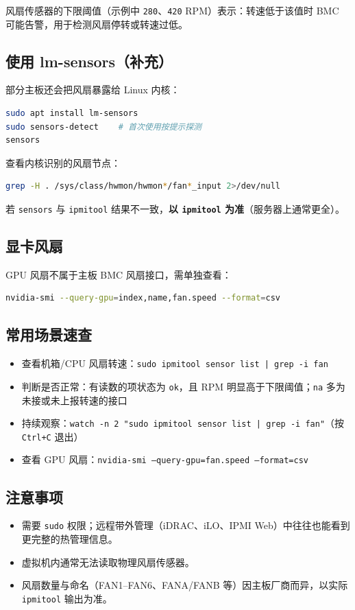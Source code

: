 风扇传感器的下限阈值（示例中 \texttt{280}、\texttt{420} RPM）表示：转速低于该值时 BMC 可能告警，用于检测风扇停转或转速过低。

\subsection{使用 lm-sensors（补充）}

部分主板还会把风扇暴露给 Linux 内核：

\begin{lstlisting}[language=sh]
sudo apt install lm-sensors
sudo sensors-detect    # 首次使用按提示探测
sensors
\end{lstlisting}

查看内核识别的风扇节点：

\begin{lstlisting}[language=sh]
grep -H . /sys/class/hwmon/hwmon*/fan*_input 2>/dev/null
\end{lstlisting}

若 \texttt{sensors} 与 \texttt{ipmitool} 结果不一致，\textbf{以 \texttt{ipmitool} 为准}（服务器上通常更全）。

\subsection{显卡风扇}

GPU 风扇不属于主板 BMC 风扇接口，需单独查看：

\begin{lstlisting}[language=sh]
nvidia-smi --query-gpu=index,name,fan.speed --format=csv
\end{lstlisting}

\subsection{常用场景速查}

\begin{itemize}
    \item 查看机箱/CPU 风扇转速：\texttt{sudo ipmitool sensor list | grep -i fan}
    \item 判断是否正常：有读数的项状态为 \texttt{ok}，且 RPM 明显高于下限阈值；\texttt{na} 多为未接或未上报转速的接口
    \item 持续观察：\texttt{watch -n 2 "sudo ipmitool sensor list | grep -i fan"}（按 \texttt{Ctrl+C} 退出）
    \item 查看 GPU 风扇：\texttt{nvidia-smi --query-gpu=fan.speed --format=csv}
\end{itemize}

\subsection{注意事项}

\begin{itemize}
    \item 需要 \texttt{sudo} 权限；远程带外管理（iDRAC、iLO、IPMI Web）中往往也能看到更完整的热管理信息。
    \item 虚拟机内通常无法读取物理风扇传感器。
    \item 风扇数量与命名（FAN1--FAN6、FANA/FANB 等）因主板厂商而异，以实际 \texttt{ipmitool} 输出为准。
\end{itemize}

